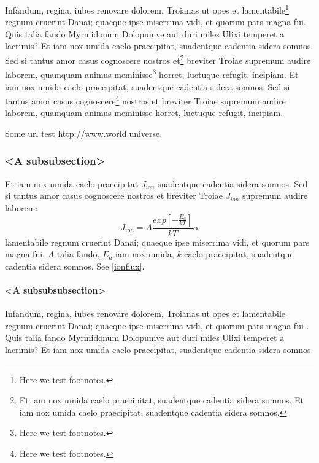 \documentclass[
    ,final            %
  ]
  {aipproc}
\begin{document}
Infandum, regina, iubes renovare dolorem, Troianas ut opes et
lamentabile\footnote{Here we test footnotes.} regnum cruerint Danai;
quaeque ipse miserrima vidi, et quorum pars magna fui. Quis talia
fando Myrmidonum Dolopumve aut duri miles Ulixi temperet a
lacrimis? Et iam nox umida caelo praecipitat, suadentque cadentia
sidera somnos. Sed si tantus amor casus cognoscere nostros
et\footnote{Et iam nox umida caelo praecipitat, suadentque cadentia
sidera somnos. Et iam nox umida caelo praecipitat, suadentque cadentia
sidera somnos.} breviter Troiae supremum audire laborem, quamquam
animus meminisse\footnote{Here we test footnotes.} horret, luctuque
refugit, incipiam.  Et iam nox umida caelo praecipitat, suadentque
cadentia sidera somnos. Sed si tantus amor casus
cognoscere\footnote{Here we test footnotes.} nostros et breviter Troiae
supremum audire laborem, quamquam animus meminisse horret,
luctuque refugit, incipiam.

Some url test \url{http://www.world.universe}.

\subsubsection{<A subsubsection>}

Et iam nox umida caelo praecipitat $J_{ion}$ suadentque cadentia
sidera somnos. Sed si tantus amor casus cognoscere nostros et breviter
Troiae $J_{ion}$ supremum audire laborem:
\begin{equation}
J_{ion}=A\frac{exp\left[-\frac{E_a}{kT}\right]}{kT}\alpha \label{ionflux}
\end{equation}
lamentabile regnum cruerint Danai; quaeque ipse miserrima vidi, et
quorum pars magna fui. $A$ talia fando, $E_a$ iam nox umida, $k$ caelo
praecipitat, suadentque cadentia sidera somnos. See \eqref{ionflux}.

\paragraph{<A subsubsubsection>}

Infandum, regina, iubes renovare dolorem, Troianas ut opes et
lamentabile regnum cruerint Danai; quaeque ipse miserrima vidi, et
quorum pars magna fui \cite{Brown2000,BrownAustin:2000}. Quis talia fando
Myrmidonum Dolopumve aut duri miles Ulixi temperet
\cite{Mittelbach/Schoepf:1990} a lacrimis? Et iam
nox umida caelo praecipitat, suadentque \cite{Wang} cadentia
sidera somnos.

\end{document}
